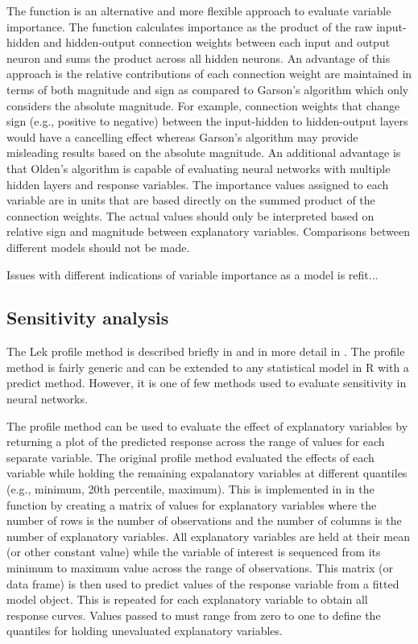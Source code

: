 \documentclass[article,shortnames]{jss}\usepackage[]{graphicx}\usepackage[]{color}
\begin{document}
The  function is an alternative and more flexible approach to evaluate variable importance. The function calculates importance as the product of the raw input-hidden and hidden-output connection weights between each input and output neuron and sums the product across all hidden neurons. An advantage of this approach is the relative contributions of each connection weight are maintained in terms of both magnitude and sign as compared to Garson's algorithm which only considers the absolute magnitude. For example, connection weights that change sign (e.g., positive to negative) between the input-hidden to hidden-output layers would have a cancelling effect whereas Garson's algorithm may provide misleading results based on the absolute magnitude. An additional advantage is that Olden's algorithm is capable of evaluating neural networks with multiple hidden layers and response variables. The importance values assigned to each variable are in units that are based directly on the summed product of the connection weights. The actual values should only be interpreted based on relative sign and magnitude between explanatory variables. Comparisons between different models should not be made.

Issues with different indications of variable importance as a model is refit...

\subsection{Sensitivity analysis}

The Lek profile method is described briefly in \citet{Lek96} and in more detail in \citet{Gevrey03}. The profile method is fairly generic and can be extended to any statistical model in R with a predict method. However, it is one of few methods used to evaluate sensitivity in neural networks.

The profile method can be used to evaluate the effect of explanatory variables by returning a plot of the predicted response across the range of values for each separate variable. The original profile method evaluated the effects of each variable while holding the remaining expalanatory variables at different quantiles (e.g., minimum, 20th percentile, maximum). This is implemented in in the function by creating a matrix of values for explanatory variables where the number of rows is the number of observations and the number of columns is the number of explanatory variables. All explanatory variables are held at their mean (or other constant value) while the variable of interest is sequenced from its minimum to maximum value across the range of observations. This matrix (or data frame) is then used to predict values of the response variable from a fitted model object. This is repeated for each explanatory variable to obtain all response curves. Values passed to  must range from zero to one to define the quantiles for holding unevaluated explanatory variables.
\end{document}

